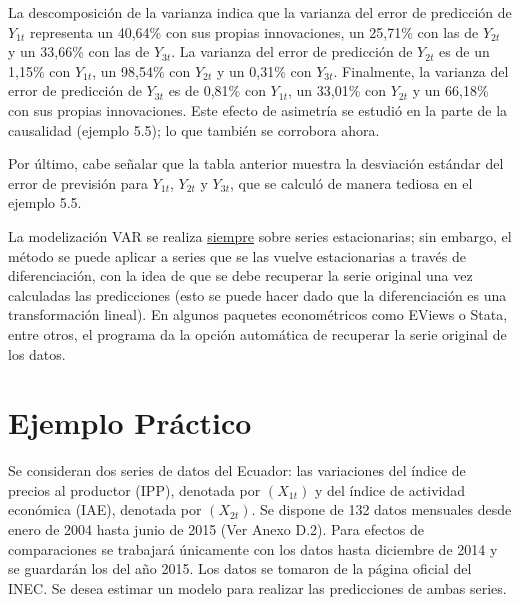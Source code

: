 \begin{enumerate}
La descomposici\'{o}n de la varianza indica que la varianza del error de predicci\'{o}n de $Y_{1t}$ representa un 40,64{\%} con sus propias innovaciones, un 25,71{\%} con las de $Y_{2t}$ y un 33,66{\%} con las de $Y_{3t}$. La varianza del error de predicci\'{o}n de $Y_{2t}$ es de un 1,15{\%} con $Y_{1t}$, un 98,54{\%} con $Y_{2t}$ y un 0,31{\%} con $Y_{3t}$.  Finalmente, la varianza del error de predicci\'{o}n de $Y_{3t}$ es de 0,81{\%} con $Y_{1t}$, un 33,01{\%} con $Y_{2t}$ y un 66,18{\%} con sus propias innovaciones. Este efecto de asimetr\'{i}a se estudi\'{o} en la parte de la causalidad (ejemplo 5.5); lo que tambi\'{e}n se corrobora ahora.\newline

Por \'{u}ltimo, cabe se\~{n}alar que la tabla anterior muestra la desviaci\'{o}n est\'{a}ndar del error de previsi\'{o}n para $Y_{1t}$, $Y_{2t}$ y $Y_{3t}$, que se calcul\'{o} de manera tediosa en el ejemplo 5.5.\newline

\begin{observacion}
La modelizaci\'{o}n VAR se realiza \underline{siempre} sobre series estacionarias; sin embargo, el m\'{e}todo se puede aplicar a series que se las vuelve estacionarias a trav\'{e}s de diferenciaci\'{o}n, con la idea de que se debe recuperar la serie original una vez calculadas las predicciones (esto se puede hacer dado que la diferenciaci\'{o}n es una transformaci\'{o}n lineal). En algunos paquetes econom\'{e}tricos como EViews o Stata, entre otros, el programa da la opci\'{o}n autom\'{a}tica de recuperar la serie original de los datos. 
\end{observacion}

\section{Ejemplo Pr\'{a}ctico}
Se consideran dos series de datos del Ecuador: las variaciones del \'{i}ndice de precios al productor (IPP), denotada por $\left( X_{1t} \right)$ y del \'{i}ndice de actividad econ\'{o}mica (IAE), denotada por $\left( X_{2t} \right)$. Se dispone de 132 datos mensuales desde enero de 2004 hasta junio de 2015 (Ver Anexo D.2). Para efectos de comparaciones se trabajar\'{a} \'{u}nicamente con los datos hasta diciembre de 2014 y se guardar\'{a}n los del a\~{n}o 2015. Los datos se tomaron de la p\'{a}gina oficial del INEC. Se desea estimar un modelo para realizar las predicciones de ambas series.\newline


\end{enumerate}

